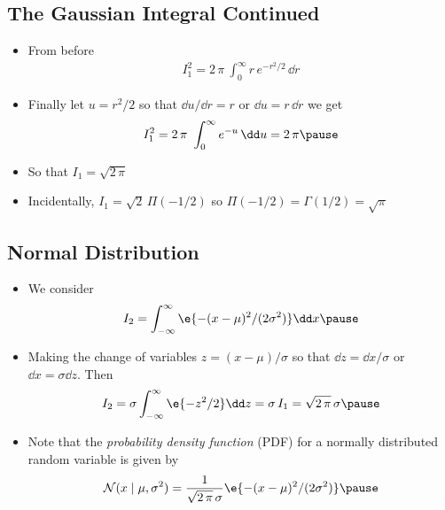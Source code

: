 \begin{slide}
\section[-1]{The Gaussian Integral Continued}

\begin{PauseHighLight}\small\squeeze
  \begin{itemize}
    \item From before
      \begin{align*}
        I_1^2   = 2\,\pi \ \int_{0}^\infty r\,e^{-r^2/2} \, \dd r
      \end{align*}
    \item Finally let $u=r^2/2$ so that $\dd u/\dd r =
      r$ or $\dd u= r\,\dd r$ we get 
      \begin{align*}
        I_1^2 = 2\,\pi\ \int_{0}^\infty e^{-u} \, \dd u = 2\,\pi\pause
      \end{align*}
    \item So that $I_1 = \sqrt{2\,\pi}$\pauseb
    \item Incidentally, $I_1 = \sqrt{2}\, \Pi(-1/2)$ so $\Pi(-1/2) =
    \Gamma(1/2) = \sqrt{\pi}$\pauseb
  \end{itemize}
\end{PauseHighLight}

\end{slide}



\begin{slide}
\section[-2]{Normal Distribution}

\begin{PauseHighLight}
  \begin{itemize}
  \item We consider
    \begin{align*}
      I_2 = \int_{-\infty}^{\infty} \e{-(x-\mu)^2/(2\sigma^2)} \dd x\pause
    \end{align*}
  \item Making the change of variables $z=(x-\mu)/\sigma$ so that $\dd z = \dd
      x/\sigma$ or $\dd x = \sigma \dd z$.  Then
      \begin{align*}
        I_2 = \sigma \int_{-\infty}^{\infty} \e{-z^2/2} \dd z =
        \sigma\,I_1 = \sqrt{2\,\pi}\,\sigma\pause
      \end{align*}
    \item Note that the \textit{probability density function} (PDF) for a
      normally distributed random variable is given by
      \begin{align*}
        \mathcal{N}(x\mid \mu, \sigma^2) = \frac{1}{\sqrt{2\,\pi}\,\sigma} \e{-(x-\mu)^2/(2\sigma^2)} \pause
      \end{align*}
  \end{itemize}
\end{PauseHighLight}

\end{slide}


